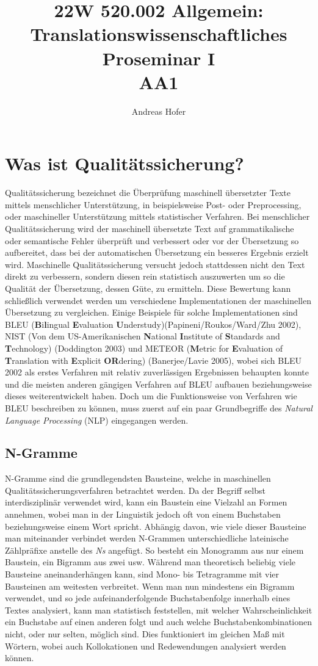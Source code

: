 \documentclass[12pt]{article}
\title{\vspace{-3cm}22W 520.002 Allgemein: Translationswissenschaftliches Proseminar I \\ AA1}
\author{Andreas Hofer}
\begin{document}
	\maketitle
	\section{Was ist Qualitätssicherung?}
	Qualitätssicherung bezeichnet die Überprüfung maschinell übersetzter Texte mittels menschlicher Unterstützung, in beispielsweise Post- oder Preprocessing, oder maschineller Unterstützung mittels statistischer Verfahren. Bei menschlicher Qualitätssicherung wird der maschinell übersetzte Text auf grammatikalische oder semantische Fehler überprüft und verbessert oder vor der Übersetzung so aufbereitet, dass bei der automatischen Übersetzung ein besseres Ergebnis erzielt wird. Maschinelle Qualitätssicherung versucht jedoch stattdessen nicht den Text direkt zu verbessern, sondern diesen rein statistisch auszuwerten um so die Qualität der Übersetzung, dessen Güte, zu ermitteln. Diese Bewertung kann schließlich verwendet werden um verschiedene Implementationen der maschinellen Übersetzung zu vergleichen. Einige Beispiele für solche Implementationen sind BLEU (\textbf{B}i\textbf{l}ingual \textbf{E}valuation \textbf{U}nderstudy)(Papineni/Roukos/Ward/Zhu 2002), NIST (Von dem US-Amerikanischen \textbf{N}ational \textbf{I}nstitute of \textbf{S}tandards and \textbf{T}echnology) (Doddington 2003) und METEOR (\textbf{M}etric for \textbf{E}valuation of \textbf{T}ranslation with \textbf{E}xplicit \textbf{OR}dering) (Banerjee/Lavie 2005), wobei sich BLEU 2002 als erstes Verfahren mit relativ zuverlässigen Ergebnissen behaupten konnte und die meisten anderen gängigen Verfahren auf BLEU aufbauen beziehungsweise dieses weiterentwickelt haben. Doch um die Funktionsweise von Verfahren wie BLEU beschreiben zu können, muss zuerst auf ein paar Grundbegriffe des \textit{Natural Language Processing} (NLP) eingegangen werden.
	\subsection{N-Gramme}
	N-Gramme sind die grundlegendsten Bausteine, welche in maschinellen Qualitätssicherungsverfahren betrachtet werden. Da der Begriff selbst interdisziplinär verwendet wird, kann ein Baustein eine Vielzahl an Formen annehmen, wobei man in der Linguistik jedoch oft von einem Buchstaben beziehungsweise einem Wort spricht. Abhängig davon, wie viele dieser Bausteine man miteinander verbindet werden N-Grammen unterschiedliche lateinische Zählpräfixe anstelle des \textit{Ns} angefügt. So besteht ein Monogramm aus nur einem Baustein, ein Bigramm aus zwei usw. Während man theoretisch beliebig viele Bausteine aneinanderhängen kann, sind Mono- bis Tetragramme mit vier Bausteinen am weitesten verbreitet. Wenn man nun mindestens ein Bigramm verwendet, und so jede aufeinanderfolgende Buchstabenfolge innerhalb eines Textes analysiert, kann man statistisch feststellen, mit welcher Wahrscheinlichkeit ein Buchstabe auf einen anderen folgt und auch welche Buchstabenkombinationen nicht, oder nur selten, möglich sind. Dies funktioniert im gleichen Maß mit Wörtern, wobei auch Kollokationen und Redewendungen analysiert werden können.
\end{document}
